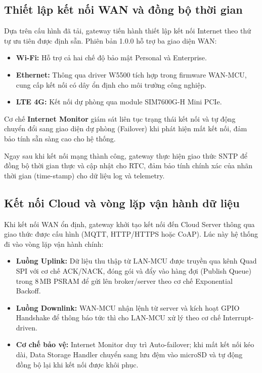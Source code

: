     \subsection{Thiết lập kết nối WAN và đồng bộ thời gian}

    Dựa trên cấu hình đã tải, gateway tiến hành thiết lập kết nối Internet theo thứ tự ưu tiên được định sẵn. Phiên bản 1.0.0 hỗ trợ ba giao diện WAN:

    \begin{itemize}
        \item \textbf{Wi-Fi:} Hỗ trợ cả hai chế độ bảo mật Personal và Enterprise.
        \item \textbf{Ethernet:} Thông qua driver W5500 tích hợp trong firmware WAN-MCU, cung cấp kết nối có dây ổn định cho môi trường công nghiệp.
        \item \textbf{LTE 4G:} Kết nối dự phòng qua module SIM7600G-H Mini PCIe.
    \end{itemize}

    Cơ chế \textbf{Internet Monitor} giám sát liên tục trạng thái kết nối và tự động chuyển đổi sang giao diện dự phòng (Failover) khi phát hiện mất kết nối, đảm bảo tính sẵn sàng cao cho hệ thống.

    Ngay sau khi kết nối mạng thành công, gateway thực hiện giao thức SNTP để đồng bộ thời gian thực và cập nhật cho RTC, đảm bảo tính chính xác của nhãn thời gian (time-stamp) cho dữ liệu log và telemetry.

    \subsection{Kết nối Cloud và vòng lặp vận hành dữ liệu}

    Khi kết nối WAN ổn định, gateway khởi tạo kết nối đến Cloud Server thông qua giao thức được cấu hình (MQTT, HTTP/HTTPS hoặc CoAP). Lúc này hệ thống đi vào vòng lặp vận hành chính:

    \begin{itemize}
        \item \textbf{Luồng Uplink:} Dữ liệu thu thập từ LAN-MCU được truyền qua kênh Quad SPI với cơ chế ACK/NACK, đóng gói và đẩy vào hàng đợi (Publish Queue) trong 8\,MB PSRAM để gửi lên broker/server theo cơ chế Exponential Backoff.
        \item \textbf{Luồng Downlink:} WAN-MCU nhận lệnh từ server và kích hoạt GPIO Handshake để thông báo tức thì cho LAN-MCU xử lý theo cơ chế Interrupt-driven.
        \item \textbf{Cơ chế bảo vệ:} Internet Monitor duy trì Auto-failover; khi mất kết nối kéo dài, Data Storage Handler chuyển sang lưu đệm vào microSD và tự động đồng bộ lại khi kết nối được khôi phục.
    \end{itemize}


